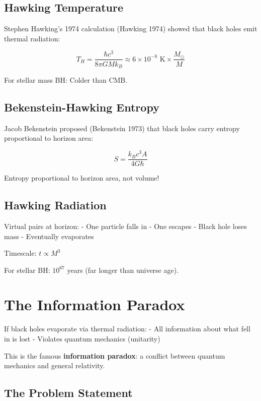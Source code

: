 \documentclass[
  11pt,
  letterpaper,
  twoside,
  openright]{book}
\begin{document}
\subsection{Hawking Temperature}\label{hawking-temperature}

Stephen Hawking's 1974 calculation (Hawking 1974) showed that black
holes emit thermal radiation:

\[
T_H = \frac{\hbar c^3}{8\pi G M k_B} \approx 6 \times 10^{-8} \text{ K} \times \frac{M_\odot}{M}
\]

For stellar mass BH: Colder than CMB.

\subsection{Bekenstein-Hawking
Entropy}\label{bekenstein-hawking-entropy}

Jacob Bekenstein proposed (Bekenstein 1973) that black holes carry
entropy proportional to horizon area:

\[
S = \frac{k_B c^3 A}{4 G \hbar}
\]

Entropy proportional to horizon area, not volume!

\subsection{Hawking Radiation}\label{hawking-radiation-1}

Virtual pairs at horizon: - One particle falls in - One escapes - Black
hole loses mass - Eventually evaporates

Timescale: \(t \propto M^3\)

For stellar BH: \(10^{67}\) years (far longer than universe age).

\section{The Information Paradox}\label{the-information-paradox}

If black holes evaporate via thermal radiation: - All information about
what fell in is lost - Violates quantum mechanics (unitarity)

This is the famous \textbf{information paradox}: a conflict between
quantum mechanics and general relativity.

\subsection{The Problem Statement}\label{the-problem-statement}
\end{document}
